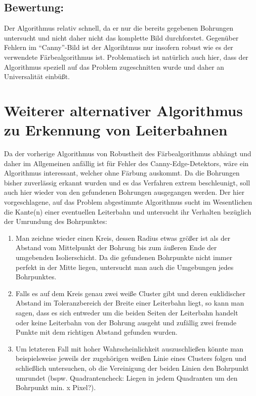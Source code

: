 \subsection{Bewertung:}
Der Algorithmus relativ schnell, da er nur die bereits gegebenen Bohrungen untersucht und nicht daher nicht das komplette Bild durchforstet. \newline
Gegenüber Fehlern im “Canny”-Bild ist der Algorihtmus nur insofern robust wie es der verwendete Färbealgorithmus ist. \newline
Problematisch ist natürlich auch hier, dass der Algorithmus speziell auf das Problem zugeschnitten wurde und daher an Universalität einbüßt.

\section{Weiterer alternativer Algorithmus zu Erkennung von Leiterbahnen}
Da der vorherige Algorithmus von Robustheit des Färbealgorithmus abhängt und daher im Allgemeinen anfällig ist für Fehler des Canny-Edge-Detektors, wäre ein Algorithmus interessant, welcher ohne Färbung auskommt. \newline
Da die Bohrungen bisher zuverlässig erkannt wurden und es das Verfahren extrem beschleunigt, soll auch hier wieder von den gefundenen Bohrungen ausgegangen werden. \newline
Der hier vorgeschlagene, auf das Problem abgestimmte Algorithmus sucht im Wesentlichen die Kante(n) einer eventuellen Leiterbahn und untersucht ihr Verhalten bezüglich der Umrundung des Bohrpunktes: \newline

\begin{enumerate}
\item Man zeichne wieder einen Kreis, dessen Radius etwas größer ist als der Abstand vom Mittelpunkt der Bohrung bis zum äußeren Ende der umgebenden Isolierschicht. \newline
Da die gefundenen Bohrpunkte nicht immer perfekt in der Mitte liegen, untersucht man auch die Umgebungen jedes Bohrpunktes.
\item Falls es auf dem Kreis genau zwei weiße Cluster gibt und deren euklidischer Abstand im Toleranzbereich der Breite einer Leiterbahn liegt, so kann man sagen, dass es sich entweder um die beiden Seiten der Leiterbahn handelt oder keine Leiterbahn von der Bohrung ausgeht und zufällig zwei fremde Punkte mit dem richtigen Abstand gefunden wurden.
\item Um letzteren Fall mit hoher Wahrscheinlichkeit auszuschließen könnte man beispielsweise jeweils der zugehörigen weißen Linie eines Clusters folgen und schließlich untersuchen, ob die Vereinigung der beiden Linien den Bohrpunkt umrundet (bspw. Quadrantencheck: Liegen in jedem Quadranten um den Bohrpunkt min. x Pixel?).
\end{enumerate}

